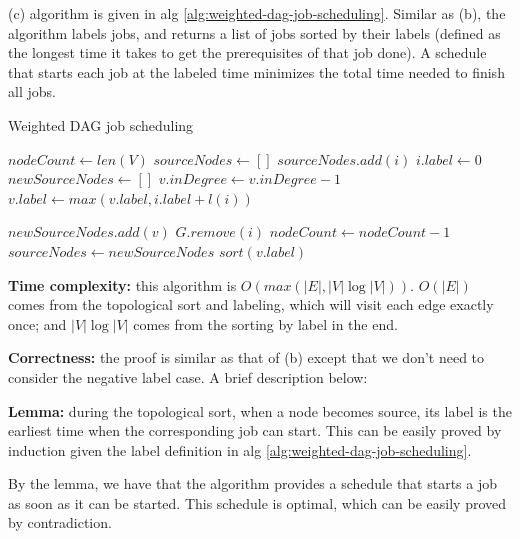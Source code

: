 \documentclass{article}
\begin{document}
\begin{description}
  (c) algorithm is given in alg \ref{alg:weighted-dag-job-scheduling}. Similar as (b), the algorithm labels jobs, and returns a list of jobs sorted by their labels (defined as the longest time it takes to get the prerequisites of that job done). A schedule that starts each job at the labeled time minimizes the total time needed to finish all jobs.

  \begin{algorithm}[h]
  \caption{Weighted DAG job scheduling}
  \label{alg:weighted-dag-job-scheduling}
    \begin{algorithmic}[1]
  
      \State $nodeCount \gets len(V)$
      \State $sourceNodes \gets []$
          \State $sourceNodes.add(i)$
          \State $i.label \gets 0$
        \EndIf
      \EndFor
        \State $newSourceNodes \gets []$
            \State $v.inDegree \gets v.inDegree - 1$
            \State $v.label \gets max(v.label, i.label + l(i))$
            
              \State $newSourceNodes.add(v)$
            \EndIf
          \EndFor
          \State $G.remove(i)$
          \State $nodeCount \gets nodeCount - 1$
        \EndFor
        \State $sourceNodes \gets newSourceNodes$
      \EndWhile
      \State \Return $sort(v.label)$
    \EndFunction
    
    \end{algorithmic}
  \end{algorithm}

  \textbf{Time complexity:} this algorithm is $O(max(|E|, |V| \log |V|))$. $O(|E|)$ comes from the topological sort and labeling, which will visit each edge exactly once; and $|V| \log |V|$ comes from the sorting by label in the end.

  \textbf{Correctness:} the proof is similar as that of (b) except that we don't need to consider the negative label case. A brief description below:

  \textbf{Lemma:} during the topological sort, when a node becomes source, its label is the earliest time when the corresponding job can start. This can be easily proved by induction given the label definition in alg \ref{alg:weighted-dag-job-scheduling}.

  By the lemma, we have that the algorithm provides a schedule that starts a job as soon as it can be started. This schedule is optimal, which can be easily proved by contradiction.


\end{description}
\end{document}
